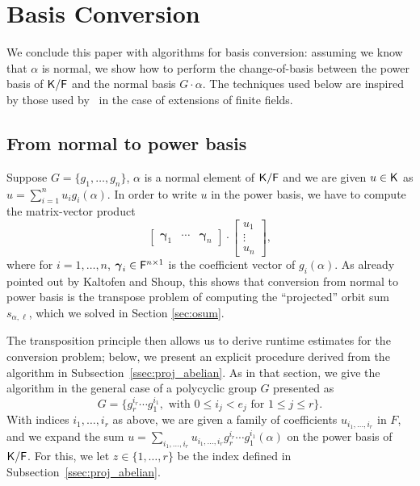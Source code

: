 \section{Basis Conversion}\label{sec:conversion}

We conclude this paper with algorithms for basis conversion: assuming
we know that $\alpha$ is normal, we show how to perform the
change-of-basis between the power basis of ${\mathsf{K}}/{\mathsf{F}}$ and the normal
basis $G\cdot \alpha$. The techniques used below are inspired by 
those used by~\cite[Section~4]{KalSho98} in the case of extensions
of finite fields.

\subsection{From normal to power basis} Suppose $G = \lbrace g_1, \ldots, g_n
\rbrace$, $\alpha$ is a normal element of ${\mathsf{K}}/{\mathsf{F}}$ and we are given $u\in {\mathsf{K}}$ 
as $u=\sum_{i=1}^n u_i g_i(\alpha)$. In order to write
$u $ in the power basis, we have to compute the matrix-vector 
product
\begin{equation}\label{eq:norm2pwrmat}
\left[\begin{array}{ccc}
\boldsymbol \gamma_1 & \cdots & \boldsymbol \gamma_n 
\end{array}\right]\cdot 
\begin{bmatrix}
u_1 \\ \vdots \\ u_n
\end{bmatrix},
\end{equation}
where for $i=1,\dots,n$, $\boldsymbol \gamma_i \in {\mathsf{F}}^{n\times 1}$ is
the coefficient vector of $g_i(\alpha)$. As already pointed out by
Kaltofen and Shoup, this shows that conversion from normal to power
basis is the transpose problem of computing the ``projected'' orbit
sum $s_{\alpha,\ell}$, which we solved in Section \ref{sec:osum}. 

The transposition principle then allows us to derive runtime estimates
for the conversion problem; below, we present an explicit procedure
derived from the algorithm in Subsection~\ref{ssec:proj_abelian}.  As
in that section, we give the algorithm in the general case of a
polycyclic group $G$ presented as
\[
G =\{ g_r^{i_r} \cdots g_1^{i_1}, \text{~with~}  0 \leq i_j < e_j \text{~for~} 1 \leq j \leq r\}.
\]
With indices $i_1,\dots,i_r$ as above, we are given a family of 
coefficients $u_{i_1,\dots,i_r}$ in $F$, and we expand the sum
$u=\sum_{i_1,\dots,i_r} u_{i_1,\dots,i_r} g_r^{i_r} \cdots g_1^{i_1}(\alpha)$
on the power basis of ${\mathsf{K}}/{\mathsf{F}}$. For this, we let $z \in\{1,\dots,r\}$ be the index
defined in Subsection~\ref{ssec:proj_abelian}.

